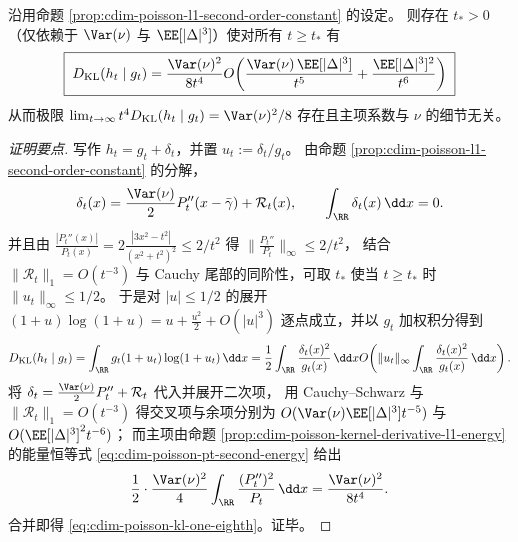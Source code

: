 \begin{proposition}\label{prop:cdim-poisson-kl-constant-one-eighth}
沿用命题 \ref{prop:cdim-poisson-l1-second-order-constant} 的设定。
则存在 \(t_\ast>0\)（仅依赖于 \(\Var(\nu)\) 与 \(\EE[|\Delta|^3]\)）使对所有 \(t\ge t_\ast\) 有
\begin{equation}\label{eq:cdim-poisson-kl-one-eighth}
\boxed{\;
D_{\mathrm{KL}}(h_t\mid g_t)
=\frac{\Var(\nu)^{2}}{8t^{4}}
O\!\left(\frac{\Var(\nu)\,\EE[|\Delta|^{3}]}{t^{5}}+\frac{\EE[|\Delta|^{3}]^{2}}{t^{6}}\right)\;}
\end{equation}
从而极限 \(\lim_{t\to\infty}t^{4}D_{\mathrm{KL}}(h_t\mid g_t)=\Var(\nu)^{2}/8\) 存在且主项系数与 \(\nu\) 的细节无关。
\end{proposition}
\begin{proof}[证明要点]
写作 \(h_t=g_t+\delta_t\)，并置 \(u_t:=\delta_t/g_t\)。
由命题 \ref{prop:cdim-poisson-l1-second-order-constant} 的分解，
\[
\delta_t(x)=\frac{\Var(\nu)}{2}P_t''(x-\bar\gamma)+\mathcal R_t(x),
\qquad
\int_{\RR}\delta_t(x)\,\dd x=0.
\]
并且由 \(\frac{|P_t''(x)|}{P_t(x)}=2\frac{|3x^2-t^2|}{(x^2+t^2)^2}\le 2/t^2\) 得
\(
\bigl\|\tfrac{P_t''}{P_t}\bigr\|_\infty\le 2/t^2
\)，
结合 \(\|\mathcal R_t\|_1=O(t^{-3})\) 与 Cauchy 尾部的同阶性，可取 \(t_\ast\) 使当 \(t\ge t_\ast\) 时 \(\|u_t\|_\infty\le 1/2\)。
于是对 \(|u|\le 1/2\) 的展开
\(
(1+u)\log(1+u)=u+\frac{u^2}{2}+O(|u|^3)
\)
逐点成立，并以 \(g_t\) 加权积分得到
\[
D_{\mathrm{KL}}(h_t\mid g_t)
=\int_{\RR}g_t(1+u_t)\log(1+u_t)\,\dd x
=\frac12\int_{\RR}\frac{\delta_t(x)^2}{g_t(x)}\,\dd x
O\!\left(\|u_t\|_\infty\int_{\RR}\frac{\delta_t(x)^2}{g_t(x)}\,\dd x\right).
\]
将 \(\delta_t=\frac{\Var(\nu)}{2}P_t''+\mathcal R_t\) 代入并展开二次项，
用 Cauchy--Schwarz 与 \(\|\mathcal R_t\|_1=O(t^{-3})\) 得交叉项与余项分别为
\(
O(\Var(\nu)\EE[|\Delta|^3]t^{-5})
\)
与
\(
O(\EE[|\Delta|^3]^2t^{-6})
\)；
而主项由命题 \ref{prop:cdim-poisson-kernel-derivative-l1-energy} 的能量恒等式 \eqref{eq:cdim-poisson-pt-second-energy} 给出
\[
\frac12\cdot\frac{\Var(\nu)^2}{4}\int_{\RR}\frac{(P_t'')^2}{P_t}\,\dd x
=\frac{\Var(\nu)^2}{8t^4}.
\]
合并即得 \eqref{eq:cdim-poisson-kl-one-eighth}。证毕。
\end{proof}

